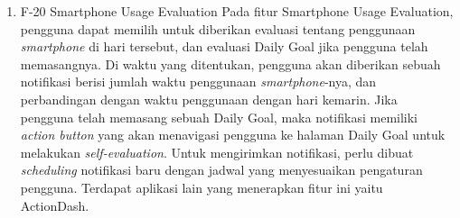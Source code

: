 \begin{enumerate}
  \item F-20 Smartphone Usage Evaluation
  \subitem Pada fitur Smartphone Usage Evaluation, pengguna dapat memilih untuk diberikan evaluasi tentang penggunaan \textit{smartphone} di hari tersebut, dan evaluasi Daily Goal jika pengguna telah memasangnya. Di waktu yang ditentukan, pengguna akan diberikan sebuah notifikasi berisi jumlah waktu penggunaan \textit{smartphone}-nya, dan perbandingan dengan waktu penggunaan dengan hari kemarin. Jika pengguna telah memasang sebuah Daily Goal, maka notifikasi memiliki \textit{action button} yang akan menavigasi pengguna ke halaman Daily Goal untuk melakukan \textit{self-evaluation}. Untuk mengirimkan notifikasi, perlu dibuat \textit{scheduling} notifikasi baru dengan jadwal yang menyesuaikan pengaturan pengguna. Terdapat aplikasi lain yang menerapkan fitur ini yaitu ActionDash.
    
\end{enumerate}